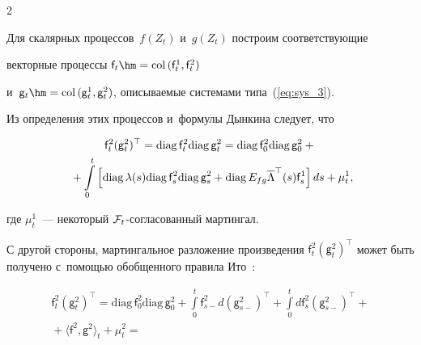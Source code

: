 \begin{multicols}{2}
{   Для скалярных процессов~$f(Z_t)$ и~$g(Z_t)$ построим соответствующие 


векторные процессы $\mathsf{f}_t \hm= \mathrm{col}\,(\mathsf{f}_t^1,\mathsf{f}_t^2)$ 


и~$\mathsf{g}_t \hm= \mathrm{col}\,(\mathsf{g}_t^1,\mathsf{g}_t^2)$, описываемые системами типа~(\ref{eq:sys_3}). 


Из определения этих процессов и~формулы Дынкина следует, что


  \begin{multline*}


   \mathsf{f}_t^2 (\mathsf{g}_t^2)^{\top} = \mathrm{diag}\,\mathsf{f}_t^2  \mathrm{diag}\,


\mathsf{g}_t^2 = \mathrm{diag}\, \mathsf{f}_0^2  \mathrm{diag}\, \mathsf{g}_0^2 +{}\\


{}+ \int\limits_0^t


   \left[


  \mathrm{diag}\, \lambda(s) \mathrm{diag}\, \mathsf{f}^2_s \mathrm{diag}\, \mathsf{g}^2_s + \mathrm{diag}\, E_{fg} 


\overline{\Lambda}^{\top}(s) \mathsf{f}^1_s


   \right]ds + \mu_t^1,\hspace*{-2.26256pt}




   \end{multline*}


   где $\mu_t^1$~--- некоторый ${\mathcal F}_t$-со\-гла\-со\-ван\-ный мартингал.





   С другой стороны, мартингальное разложение произведения $\mathsf{f}_t^2 


(\mathsf{g}_t^2)^{\top} $ может быть получено с~по\-мощью обобщенного правила Ито~\cite{LSh_86}:


    \begin{multline*}


   \mathsf{f}_t^2 (\mathsf{g}_t^2)^{\top} =


   \mathrm{diag}\, \mathsf{f}_0^2  \mathrm{diag}\, \mathsf{g}_0^2 + \!\int\limits_0^t\! \mathsf{f}_{s-}^2d(\mathsf{g}_{s-}^2)^{\top} 


   +\!\int\limits_0^t \! d \mathsf{f}_{s}^2(\mathsf{g}_{s-}^2)^{\top} +{}\\


   {}+ \langle 


\mathsf{f}^2, \mathsf{g}^2\rangle_t + \mu_t^2 =



\end{multline*}}
\end{multicols}
